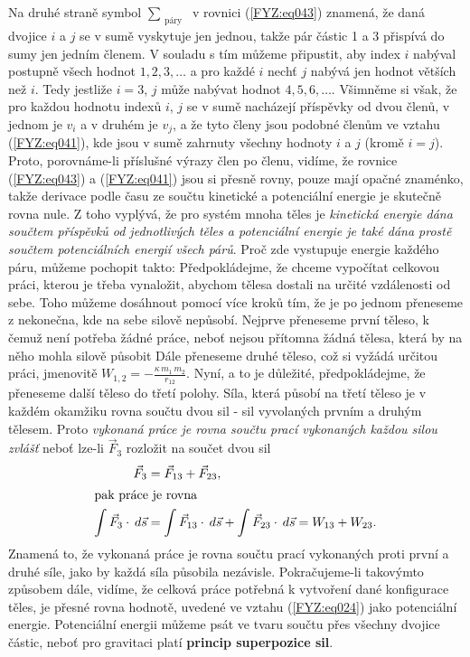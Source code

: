 {    Na druhé straně symbol \(\sum_{\substack{\text{páry}}}\)  v rovnici (\ref{FYZ:eq043}) znamená, 
    že daná dvojice \(i\) a \(j\) se v sumě vyskytuje jen jednou, takže pár částic \num{1} a 
    \num{3} přispívá do sumy jen jedním členem. V souladu s tím můžeme připustit, aby index \(i\) 
    nabýval postupně všech hodnot \(1, 2, 3, \ldots\) a pro každé \(i\) nechť \(j\) nabývá jen 
    hodnot větších než \(i\). Tedy jestliže \(i = 3\), \(j\) může nabývat hodnot \(4, 5, 6, 
    \ldots\). Všimněme si však, že pro každou hodnotu indexů \(i\), \(j\) se v sumě nacházejí 
    příspěvky od dvou členů, v jednom je \(v_i\) a v druhém je \(v_j\), a že tyto členy jsou 
    podobné členům ve vztahu  (\ref{FYZ:eq041}), kde jsou v sumě zahrnuty všechny hodnoty \(i\) a 
    \(j\) (kromě \(i=j\)). Proto, porovnáme-li příslušné výrazy člen po členu, vidíme, že rovnice  
    (\ref{FYZ:eq043}) a  (\ref{FYZ:eq041}) jsou si přesně rovny, pouze mají opačné znaménko, takže 
    derivace podle času ze součtu kinetické a potenciální energie je skutečně rovna nule. Z toho 
    vyplývá, že pro systém mnoha těles je \emph{kinetická energie dána součtem příspěvků od 
    jednotlivých těles a potenciální energie je také dána prostě součtem potenciálních energií 
    všech párů}. Proč zde vystupuje energie každého páru, můžeme pochopit takto: Předpokládejme, že 
    chceme vypočítat celkovou práci, kterou je třeba vynaložit, abychom tělesa dostali na určité 
    vzdálenosti od sebe. Toho můžeme dosáhnout pomocí více kroků tím, že je po jednom přeneseme z 
    nekonečna, kde na sebe silově nepůsobí. Nejprve přeneseme první těleso, k čemuž není potřeba 
    žádné práce, neboť nejsou přítomna žádná tělesa, která by na něho mohla silově působit Dále 
    přeneseme druhé těleso, což si vyžádá určitou práci, jmenovitě \(W_{1,2} = - 
    \frac{\kappa\,m_1\,m_2}{r_{12}}\). Nyní, a to je důležité, předpokládejme, že přeneseme další 
    těleso do třetí polohy. Síla, která působí na třetí těleso je v každém okamžiku rovna součtu 
    dvou sil - sil vyvolaných prvním a druhým tělesem. Proto \emph{vykonaná práce je rovna součtu 
    prací vykonaných každou silou zvlášť} neboť lze-li \(\vec{F}_3\) rozložit na součet dvou sil
    \begin{align*}
     \vec{F}_3 &= \vec{F}_{13} + \vec{F}_{23},        \\
      \shortintertext{pak práce je rovna}
      \int\vec{F}_3\cdot\hspace{2pt}d\vec{s} 
                &=  \int\vec{F}_{13}\cdot\hspace{2pt}d\vec{s} + 
                    \int\vec{F}_{23}\cdot\hspace{2pt}d\vec{s}
                 = W_{13} + W_{23}. 
    \end{align*}
    Znamená to, že vykonaná práce je rovna součtu prací vykonaných proti první a druhé síle, jako 
    by každá síla působila nezávisle. Pokračujeme-li takovýmto způsobem dále, vidíme, že celková 
    práce potřebná k vytvoření dané konfigurace těles, je přesné rovna hodnotě, uvedené ve vztahu 
    (\ref{FYZ:eq024}) jako potenciální energie. Potenciální energii můžeme psát ve tvaru součtu 
    přes všechny dvojice částic, neboť pro gravitaci platí \textbf{princip superpozice sil}.
    
}
